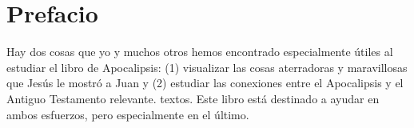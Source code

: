 \ClearShipoutPicture
{}

\blankpage
\clearpage
\clearpage

\begin{KeepFromToc}
\tableofcontents
\end{KeepFromToc}
\clearpage
\listoffigures
\clearpage

\chapter{Prefacio}
Hay dos cosas que yo y muchos otros hemos encontrado especialmente útiles al estudiar el libro de Apocalipsis: (1) visualizar las cosas aterradoras y maravillosas que Jesús le mostró a Juan y (2) estudiar las conexiones entre el Apocalipsis y el Antiguo Testamento relevante. textos. Este libro está destinado a ayudar en ambos esfuerzos, pero especialmente en el último. \\

